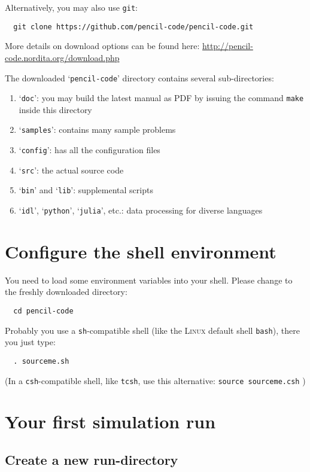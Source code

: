\documentclass[a4paper,12pt]{article}
\newcommand{\command}[1]{\texttt{#1}}
\newcommand{\directory}[1]{`\texttt{#1}'}
\newcommand{\name}[1]{\textsc{#1}}
\begin{document}
Alternatively, you may also use \command{git}:
\begin{verbatim}
  git clone https://github.com/pencil-code/pencil-code.git
\end{verbatim}

More details on download options can be found here: \url{http://pencil-code.nordita.org/download.php}

The downloaded \directory{pencil-code} directory contains several sub-directories:
\begin{enumerate}
  \item \directory{doc}: you may build the latest manual as PDF by issuing the command \command{make} inside this directory
  \item \directory{samples}: contains many sample problems
  \item \directory{config}: has all the configuration files
  \item \directory{src}: the actual source code
  \item \directory{bin} and \directory{lib}: supplemental scripts
  \item \directory{idl}, \directory{python}, \directory{julia}, etc.: data processing for diverse languages
\end{enumerate}


\section{Configure the shell environment}

You need to load some environment variables into your shell.
Please change to the freshly downloaded directory:
\begin{verbatim}
  cd pencil-code
\end{verbatim}

Probably you use a \command{sh}-compatible shell (like the \name{Linux} default shell \command{bash}), there you just type:
\begin{verbatim}
  . sourceme.sh
\end{verbatim}

(In a \command{csh}-compatible shell, like \command{tcsh}, use this alternative: \command{source sourceme.csh} )


\section{Your first simulation run}

\subsection{Create a new run-directory}
\end{document}
